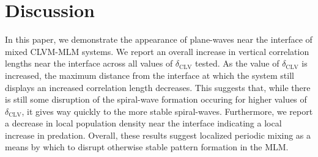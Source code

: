 \documentclass[12pt]{article}
\begin{document}
\section{Discussion}%
\label{sec:conclusion}
In this paper, we demonstrate the appearance of plane-waves near the interface 
of mixed CLVM-MLM systems. We report an overall increase in vertical correlation
lengths near the interface across all values of $ \delta_{\mathrm{CLV}} $ tested.
As the value of $ \delta_{\mathrm{CLV}} $ is increased, the maximum distance from 
the interface at which the system still displays an increased correlation length
decreases. This suggests that, while there is still some disruption of the spiral-wave
formation occuring for higher values of $ \delta_{\mathrm{CLV}} $, it gives way 
quickly to the more stable spiral-waves. Furthermore, we report a decrease in local
population density near the interface indicating a local increase in predation. 
Overall, these results suggest localized periodic mixing as a means by which to
disrupt otherwise stable pattern formation in the MLM.



\end{document}
